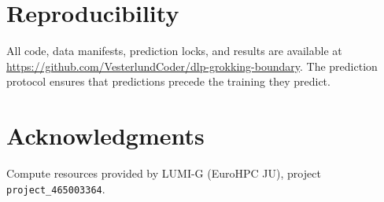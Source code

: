 \documentclass[11pt]{article}
\begin{document}
\section*{Reproducibility}

All code, data manifests, prediction locks, and results are available at \url{https://github.com/VesterlundCoder/dlp-grokking-boundary}. The prediction protocol ensures that predictions precede the training they predict.

\section*{Acknowledgments}

Compute resources provided by LUMI-G (EuroHPC JU), project \texttt{project\_465003364}.



\end{document}
